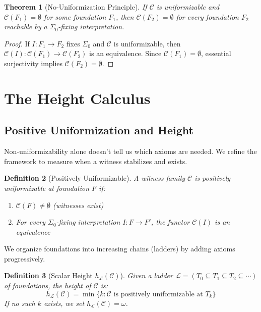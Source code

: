 \documentclass[11pt]{article}
\newtheorem{theorem}{Theorem}[section]
\newtheorem{definition}[theorem]{Definition}
\newcommand{\SigmaZero}{\Sigma_{0}}
\begin{document}
\begin{theorem}[No-Uniformization Principle]\label{thm:no-unif}
If $\mathcal{C}$ is uniformizable and $\mathcal{C}(F_1) = \emptyset$ for some foundation $F_1$, then $\mathcal{C}(F_2) = \emptyset$ for every foundation $F_2$ reachable by a $\SigmaZero$-fixing interpretation.
\end{theorem}
\begin{proof}
If $I: F_1 \to F_2$ fixes $\SigmaZero$ and $\mathcal{C}$ is uniformizable, then $\mathcal{C}(I): \mathcal{C}(F_1) \to \mathcal{C}(F_2)$ is an equivalence. Since $\mathcal{C}(F_1) = \emptyset$, essential surjectivity implies $\mathcal{C}(F_2) = \emptyset$.
\end{proof}

\section{The Height Calculus}

\subsection{Positive Uniformization and Height}

Non-uniformizability alone doesn't tell us which axioms are needed. We refine the framework to measure when a witness stabilizes and exists.

\begin{definition}[Positively Uniformizable]
A witness family $\mathcal{C}$ is \emph{positively uniformizable} at foundation $F$ if:
\begin{enumerate}
\item $\mathcal{C}(F) \neq \emptyset$ (witnesses exist)
\item For every $\SigmaZero$-fixing interpretation $I: F \to F'$, the functor $\mathcal{C}(I)$ is an equivalence
\end{enumerate}
\end{definition}

We organize foundations into increasing chains (ladders) by adding axioms progressively.

\begin{definition}[Scalar Height \(h_{\mathcal L}(\mathcal C)\)]
Given a ladder $\mathcal{L} = (T_0 \subseteq T_1 \subseteq T_2 \subseteq \cdots)$ of foundations, the \emph{height} of $\mathcal{C}$ is:
\[
h_{\mathcal L}(\mathcal{C}) = \min\{k : \mathcal{C} \text{ is positively uniformizable at } T_k\}
\]
If no such $k$ exists, we set $h_{\mathcal L}(\mathcal{C}) = \omega$.
\end{definition}
\end{document}
